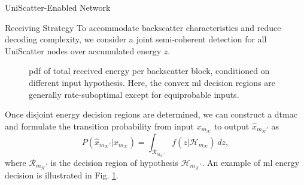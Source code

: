 \documentclass[journal]{IEEEtran}
\begin{document}
\begin{section}{UniScatter-Enabled Network}
\begin{subsection}{Receiving Strategy}
		To accommodate backscatter characteristics and reduce decoding complexity, we consider a joint semi-coherent detection for all UniScatter nodes over accumulated energy $z$.
		\begin{figure}[!t]
			\centering
			\resizebox{0.9\columnwidth}{!}{
				
			}
			\caption{
				\gls{pdf} of total received energy per backscatter block, conditioned on different input hypothesis.
				Here, the convex \gls{ml} decision regions are generally rate-suboptimal except for equiprobable inputs.
			}
			\label{fi:energy_distribution}
		\end{figure}
		Once disjoint energy decision regions are determined, we can construct a \gls{dtmac} and formulate the transition probability from input $x_{m_{\mathcal{K}}}$ to output $\hat{x}_{m_{\mathcal{K}}'}$ as
		\begin{equation}
			P(\hat{x}_{m_{\mathcal{K}}'}|x_{m_{\mathcal{K}}}) = \int_{\mathcal{R}_{m_{\mathcal{K}}'}} f(z|\mathcal{H}_{m_{\mathcal{K}}}) \, d z,
			\label{eq:dtmac}
		\end{equation}
		where $\mathcal{R}_{m_{\mathcal{K}}'}$ is the decision region of hypothesis $\mathcal{H}_{m_{\mathcal{K}}'}$. An example of \gls{ml} energy decision is illustrated in Fig. \ref{fi:energy_distribution}.


\end{subsection}
\end{section}
\end{document}

